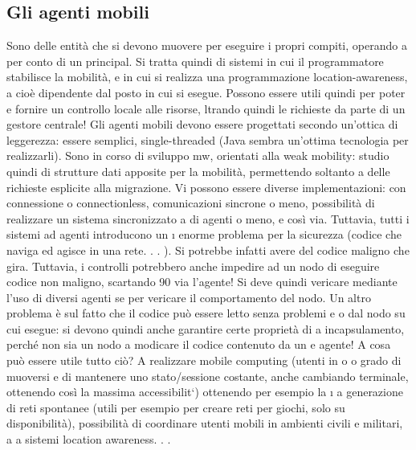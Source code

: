 \subsection{Gli agenti mobili}
Sono delle entità che si devono muovere per eseguire i propri compiti, operando
a
per conto di un principal. Si tratta quindi di sistemi in cui il programmatore stabilisce la mobilità, e in cui si
realizza una programmazione location-awareness,
a
cioè dipendente dal posto in cui si esegue. Possono essere utili quindi per poter
e
fornire un controllo locale alle risorse, ltrando quindi le richieste da parte di un
gestore centrale! Gli agenti mobili devono essere progettati secondo un'ottica di
leggerezza: essere semplici, single-threaded (Java sembra un'ottima tecnologia
per realizzarli). Sono in corso di sviluppo mw, orientati alla weak mobility:
studio quindi di strutture dati apposite per la mobilità, permettendo soltanto
a
delle richieste esplicite alla migrazione.
Vi possono essere diverse implementazioni: con connessione o connectionless,
comunicazioni sincrone o meno, possibilità di realizzare un sistema sincronizzato
a
di agenti o meno, e così via. Tuttavia, tutti i sistemi ad agenti introducono un
\i{}
enorme problema per la sicurezza (codice che naviga ed agisce in una rete. . . ). Si
potrebbe infatti avere del codice maligno che gira. Tuttavia, i controlli potrebbero anche impedire ad un nodo di
eseguire codice non maligno, scartando
90
via l'agente! Si deve quindi vericare mediante l'uso di diversi agenti se per
vericare il comportamento del nodo.
Un altro problema è sul fatto che il codice può essere letto senza problemi
e
o
dal nodo su cui esegue: si devono quindi anche garantire certe proprietà di
a
incapsulamento, perché non sia un nodo a modicare il codice contenuto da un
e
agente!
A cosa può essere utile tutto ciò? A realizzare mobile computing (utenti in
o
o
grado di muoversi e di mantenere uno stato/sessione costante, anche cambiando
terminale, ottenendo così la massima accessibilit`) ottenendo per esempio la
\i{}
a
generazione di reti spontanee (utili per esempio per creare reti per giochi, solo su
disponibilità), possibilità di coordinare utenti mobili in ambienti civili e militari,
a
a
sistemi location awareness. . .